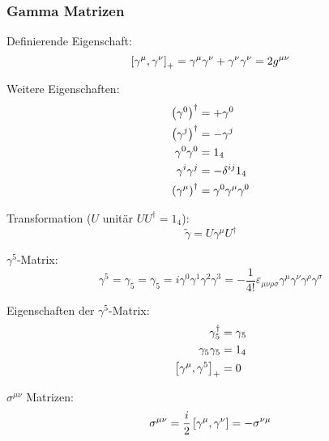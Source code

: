 \documentclass[11pt]{article}
\numberwithin{equation}{section}
\begin{document}
			\subsubsection{Gamma Matrizen}
				\noindent
				Definierende Eigenschaft:
				\begin{equation}
					\left[\gamma^\mu,\gamma^\nu\right]_{+} = \gamma^\mu \gamma^\nu + \gamma^\nu \gamma^\nu = 2g^{\mu\nu}
				\end{equation}

				\noindent
				Weitere Eigenschaften:
				\begin{equation}
					\begin{aligned}
						\Br{\gamma^0}^\dagger &= +\gamma^0 \\
						\Br{\gamma^j}^\dagger &= -\gamma^j \\
						\gamma^0 \gamma^0 &= 1_4 \\ %
						\gamma^i \gamma^j &= - \delta^{ij} 1_4 \\
						\Br{\gamma^\mu}^\dagger &= \gamma^0 \gamma^\mu \gamma^0 \\
					\end{aligned}
				\end{equation}

				\noindent
				Transformation ($U$ unitär $U U^\dagger=1_4$):
				\begin{equation}
					\tilde{\gamma} = U \gamma^\mu U^\dagger
				\end{equation}

				\noindent
				$\gamma^5$-Matrix:
				\begin{equation}
					\gamma^5 = \gamma_5 = \gamma_5 = i\gamma^0 \gamma^1 \gamma^2 \gamma^3 = -\frac{1}{4!}\varepsilon_{\mu\nu\rho\sigma} \gamma^\mu \gamma^\nu \gamma^\rho \gamma^\sigma
				\end{equation}

				\noindent
				Eigenschaften der $\gamma^5$-Matrix:
				\begin{equation}
					\begin{aligned}
						\gamma_5^\dagger &= \gamma_5 \\
						\gamma_5 \gamma_5 &= 1_4 \\
						\left[\gamma^\mu,\gamma^5\right]_{+} &= 0 \\
					\end{aligned}
				\end{equation}

				\noindent
				$\sigma^{\mu\nu}$ Matrizen:
				\begin{equation}
					\sigma^{\mu\nu} = \frac{i}{2}\left[\gamma^\mu,\gamma^\nu\right] = -\sigma^{\nu\mu}
				\end{equation}
\end{document}
